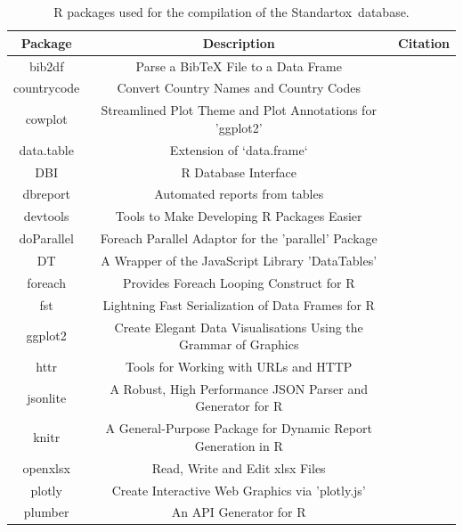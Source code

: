 \documentclass[data,datadescriptor,accept,moreauthors,pdftex]{Definitions/mdpi}
\begin{document}
\section{}

\begin{table}[H]
    \caption{R packages used for the compilation of the Standartox~database.}
    \label{tab:rpackages}
    \centering
\begin{tabular}{ccc}
\toprule
\textbf{Package} & \textbf{Description} & \textbf{Citation} \\ 
\midrule
bib2df & Parse a BibTeX File to a Data Frame &~\citep{R-bib2df} \\
countrycode & Convert Country Names and Country Codes &~\citep{R-countrycode} \\
cowplot & Streamlined Plot Theme and Plot Annotations for 'ggplot2' &~\citep{R-cowplot} \\
data.table & Extension of `data.frame` &~\citep{R-data.table} \\
DBI & R Database Interface &~\citep{R-DBI} \\
dbreport & Automated reports from tables &~\citep{R-dbreport} \\
devtools & Tools to Make Developing R Packages Easier &~\citep{R-devtools} \\
doParallel & Foreach Parallel Adaptor for the 'parallel' Package &~\citep{R-doParallel} \\
DT & A Wrapper of the JavaScript Library 'DataTables' &~\citep{R-DT} \\
foreach & Provides Foreach Looping Construct for R &~\citep{R-foreach} \\
fst & Lightning Fast Serialization of Data Frames for R &~\citep{R-fst} \\
ggplot2 & Create Elegant Data Visualisations Using the Grammar of Graphics &~\citep{R-ggplot2} \\ httr & Tools for Working with URLs and HTTP &~\citep{R-httr} \\
jsonlite & A Robust, High Performance JSON Parser and Generator for R &~\citep{R-jsonlite} \\
knitr & A General-Purpose Package for Dynamic Report Generation in R &~\citep{R-knitr} \\
openxlsx & Read, Write and Edit xlsx Files &~\citep{R-openxlsx} \\
plotly & Create Interactive Web Graphics via 'plotly.js' &~\citep{R-plotly} \\
plumber & An API Generator for R &~\citep{R-plumber} \\

\end{tabular}
\end{table}
\end{document}
